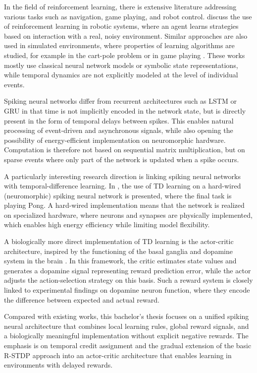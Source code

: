 \documentclass[a4paper,12pt,openright]{book}
\begin{document}
In the field of reinforcement learning, there is extensive literature addressing various tasks such as navigation, game playing, and robot control. \citet{robot} discuss the use of reinforcement learning in robotic systems, where an agent learns strategies based on interaction with a real, noisy environment. Similar approaches are also used in simulated environments, where properties of learning algorithms are studied, for example in the cart-pole problem \citet{vozicekSPalico} or in game playing \citet{predvidevanjeAkcij}. These works mostly use classical neural network models or symbolic state representations, while temporal dynamics are not explicitly modeled at the level of individual events.

Spiking neural networks differ from recurrent architectures such as LSTM or GRU in that time is not implicitly encoded in the network state, but is directly present in the form of temporal delays between spikes. This enables natural processing of event-driven and asynchronous signals, while also opening the possibility of energy-efficient implementation on neuromorphic hardware. Computation is therefore not based on sequential matrix multiplication, but on sparse events where only part of the network is updated when a spike occurs.

A particularly interesting research direction is linking spiking neural networks with temporal-difference learning. In \citet{pilotStudy}, the use of TD learning on a hard-wired (neuromorphic) spiking neural network is presented, where the final task is playing Pong. A hard-wired implementation means that the network is realized on specialized hardware, where neurons and synapses are physically implemented, which enables high energy efficiency while limiting model flexibility.

A biologically more direct implementation of TD learning is the actor-critic architecture, inspired by the functioning of the basal ganglia and dopamine system in the brain \citet{actorCritic}. In this framework, the critic estimates state values and generates a dopamine signal representing reward prediction error, while the actor adjusts the action-selection strategy on this basis. Such a reward system is closely linked to experimental findings on dopamine neuron function, where they encode the difference between expected and actual reward.

Compared with existing works, this bachelor's thesis focuses on a unified spiking neural architecture that combines local learning rules, global reward signals, and a biologically meaningful implementation without explicit negative rewards. The emphasis is on temporal credit assignment and the gradual extension of the basic R-STDP approach into an actor-critic architecture that enables learning in environments with delayed rewards.
\end{document}
